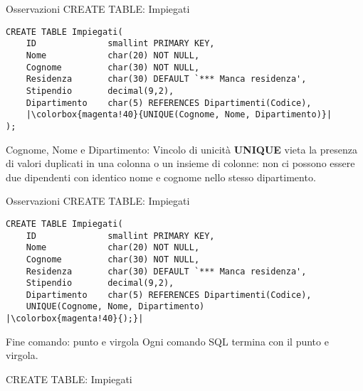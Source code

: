 %
\begin{frame}[fragile]{Osservazioni CREATE TABLE: Impiegati}
\begin{lstlisting}
CREATE TABLE Impiegati(
    ID              smallint PRIMARY KEY,
    Nome            char(20) NOT NULL,
    Cognome         char(30) NOT NULL,
    Residenza       char(30) DEFAULT `*** Manca residenza',
    Stipendio       decimal(9,2),
    Dipartimento    char(5) REFERENCES Dipartimenti(Codice),
    |\colorbox{magenta!40}{UNIQUE(Cognome, Nome, Dipartimento)}|
);
\end{lstlisting}
\begin{block}{Cognome, Nome e Dipartimento: Vincolo di unicit\`a}
    \textbf{UNIQUE} vieta la presenza di valori duplicati in una colonna o un insieme di colonne: non ci possono essere due dipendenti con identico nome e cognome nello stesso dipartimento.
\end{block}
\end{frame}
%
\begin{frame}[fragile]{Osservazioni CREATE TABLE: Impiegati}
\begin{lstlisting}
CREATE TABLE Impiegati(
    ID              smallint PRIMARY KEY,
    Nome            char(20) NOT NULL,
    Cognome         char(30) NOT NULL,
    Residenza       char(30) DEFAULT `*** Manca residenza',
    Stipendio       decimal(9,2),
    Dipartimento    char(5) REFERENCES Dipartimenti(Codice),
    UNIQUE(Cognome, Nome, Dipartimento)
|\colorbox{magenta!40}{);}|
\end{lstlisting}
\begin{minipage}{0.6\textwidth}
    \begin{block}{Fine comando: punto e virgola}
        Ogni comando SQL termina con il punto e virgola.
    \end{block}
\end{minipage}
\end{frame}
%
\begin{frame}{CREATE TABLE: Impiegati}
\vspace*{0.9cm}

\end{frame}
